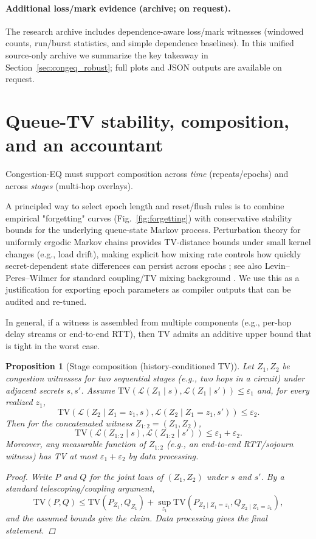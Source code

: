 \documentclass[11pt]{article}
\newtheorem{proposition}{Proposition}
\theoremstyle{definition}
\theoremstyle{remark}
\newcommand{\TV}{\mathrm{TV}}
\newcommand{\eps}{\varepsilon}
\begin{document}
\paragraph{Additional loss/mark evidence (archive; on request).}
The research archive includes dependence-aware loss/mark witnesses (windowed counts, run/burst statistics, and simple dependence baselines).
In this unified source-only archive we summarize the key takeaway in Section~\ref{sec:congeq_robust}; full plots and JSON outputs are available on request.

\section{Queue-TV stability, composition, and an accountant}
Congestion-EQ must support composition across \emph{time} (repeats/epochs) and across \emph{stages} (multi-hop overlays).

A principled way to select epoch length and reset/flush rules is to combine empirical "forgetting" curves (Fig.~\ref{fig:forgetting}) with conservative stability bounds for the underlying queue-state Markov process.
Perturbation theory for uniformly ergodic Markov chains provides TV-distance bounds under small kernel changes (e.g., load drift), making explicit how mixing rate controls how quickly secret-dependent state differences can persist across epochs \cite{mitrophanov2005}; see also Levin--Peres--Wilmer for standard coupling/TV mixing background \cite{levin_peres_wilmer}.
We use this as a justification for exporting epoch parameters as compiler outputs that can be audited and re-tuned.

In general, if a witness is assembled from multiple components (e.g., per-hop delay streams or end-to-end RTT), then TV admits an additive upper bound that is tight in the worst case.

\begin{proposition}[Stage composition (history-conditioned TV)]
Let $Z_1,Z_2$ be congestion witnesses for two sequential stages (e.g., two hops in a circuit) under adjacent secrets $s,s'$.
Assume $\TV(\mathcal{L}(Z_1\mid s),\mathcal{L}(Z_1\mid s'))\le \eps_1$ and, for every realized $z_1$,
\[
\TV(\mathcal{L}(Z_2\mid Z_1=z_1,s),\mathcal{L}(Z_2\mid Z_1=z_1,s'))\le \eps_2.
\]
Then for the concatenated witness $Z_{1:2}=(Z_1,Z_2)$,
\[
\TV(\mathcal{L}(Z_{1:2}\mid s),\mathcal{L}(Z_{1:2}\mid s')) \le \eps_1+\eps_2.
\]
Moreover, any measurable function of $Z_{1:2}$ (e.g., an end-to-end RTT/sojourn witness) has TV at most $\eps_1+\eps_2$ by data processing.

\begin{proof}
Write $P$ and $Q$ for the joint laws of $(Z_1,Z_2)$ under $s$ and $s'$.
By a standard telescoping/coupling argument,
\[
\TV(P,Q)\le \TV(P_{Z_1},Q_{Z_1}) + \sup_{z_1}\TV(P_{Z_2\mid Z_1=z_1},Q_{Z_2\mid Z_1=z_1}),
\]
and the assumed bounds give the claim.
Data processing gives the final statement.
\end{proof}
\end{proposition}
\end{document}
